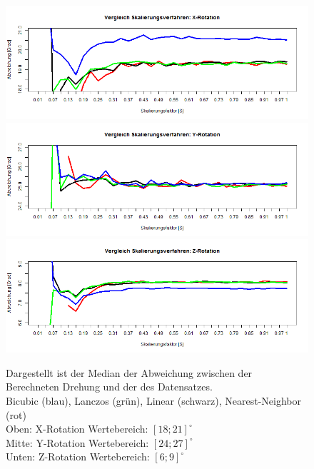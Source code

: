\begin{figure}
	\centering
	\includegraphics[width=\linewidth]{img_Skalierung/Skal_Diff_RX}
	\includegraphics[width=\linewidth]{img_Skalierung/Skal_Diff_RY}
	\includegraphics[width=\linewidth]{img_Skalierung/Skal_Diff_RZ}
	\caption{Dargestellt ist der Median der Abweichung zwischen der Berechneten Drehung und der des Datensatzes.\\
		Bicubic (blau), Lanczos (grün), Linear (schwarz), Nearest-Neighbor (rot)\\
		Oben: X-Rotation Wertebereich: $[18;21]^\circ$\\
		Mitte: Y-Rotation Wertebereich: $[24;27]^\circ$\\
		Unten: Z-Rotation Wertebereich: $[6;9]^\circ$}
	\label{img_Rot_Dif}
\end{figure}
